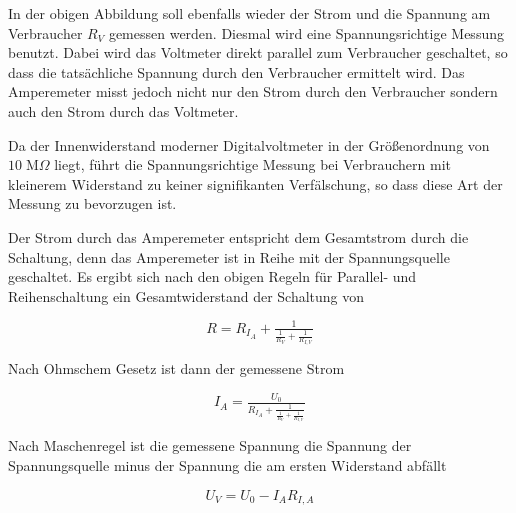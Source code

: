 In der obigen Abbildung soll ebenfalls wieder der Strom und die Spannung am
Verbraucher $R_V$ gemessen werden. Diesmal wird eine Spannungsrichtige Messung
benutzt. Dabei wird das Voltmeter direkt parallel zum Verbraucher geschaltet,
so dass die tatsächliche Spannung durch den Verbraucher ermittelt wird. Das
Amperemeter misst jedoch nicht nur den Strom durch den Verbraucher sondern auch
den Strom durch das Voltmeter.

Da der Innenwiderstand moderner Digitalvoltmeter in der Größenordnung von $10
\;\text{M}\Omega$ liegt, führt die Spannungsrichtige Messung bei Verbrauchern
mit kleinerem Widerstand zu keiner signifikanten Verfälschung, so dass diese
Art der Messung zu bevorzugen ist.

Der Strom durch das Amperemeter entspricht dem Gesamtstrom durch die Schaltung,
denn das Amperemeter ist in Reihe mit der Spannungsquelle geschaltet. Es ergibt
sich nach den obigen Regeln für Parallel- und Reihenschaltung ein
Gesamtwiderstand der Schaltung von

\begin{equation}
  R = R_{I_A} + \tfrac{1}{\tfrac{1}{R_V} + \tfrac{1}{R_{I,V}}}
\end{equation}

Nach Ohmschem Gesetz ist dann der gemessene Strom

\begin{equation}
  I_A = \tfrac{U_0}{R_{I_A} + \tfrac{1}{\tfrac{1}{R_V} + \tfrac{1}{R_{I,V}}}}
\end{equation}

Nach Maschenregel ist die gemessene Spannung die Spannung der Spannungsquelle
minus der Spannung die am ersten Widerstand abfällt

\begin{equation}
  U_V = U_0 - I_A R_{I,A}
\end{equation}

%
%



